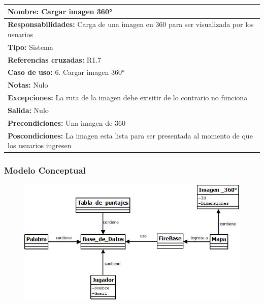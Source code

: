 \begin{table}[H]
    \begin{center}
        \begin{tabular}{| m{15cm} |}          
        	\hline 
        	\textbf{Nombre:} Cargar imagen 360°\\
        	\hline
        	\textbf{Responsabilidades:} Carga de una imagen en 360 para ser visualizada por los usuarios\\
        	\hline
        	\textbf{Tipo:} Sistema\\
        	\hline
        	\textbf{Referencias cruzadas:} R1.7\\
        	\hline
        	\textbf{Caso de uso:} 6. Cargar imagen 360°\\
        	\hline
        	\textbf{Notas:} Nulo\\
        	\hline
        	\textbf{Excepciones:} La ruta de la imagen debe exisitir de lo contrario no funciona\\
        	\hline
        	\textbf{Salida:} Nulo\\
        	\hline
        	\textbf{Precondiciones:} Una imagen de 360 \\
        	\hline
        	\textbf{Poscondiciones:} La imagen esta lista para ser presentada al momento de que los usuarios ingresen\\
        	\hline
        \end{tabular}
    \end{center}
\end{table}

\subsubsection{Modelo Conceptual}
\begin{figure}[H]
\centering
   \includegraphics[scale=0.9]{imgs/ModeloConceptual.jpeg}
\end{figure}
